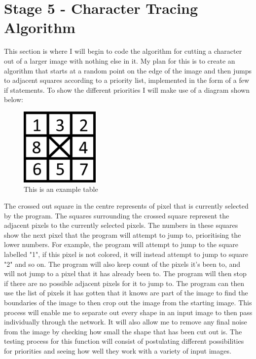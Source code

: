 \documentclass{report}
\begin{document}
\section{Stage 5 - Character Tracing Algorithm}
This section is where I will begin to code the algorithm for cutting a character out of a larger image with nothing else in it. My plan for this is to create an algorithm that starts at a random point on the edge of the image and then jumps to adjacent squares according to a priority list, implemented in the form of a few if statements. To show the different priorities I will make use of a diagram shown below:
\begin{figure}[H]
    \centering
    \includegraphics[height = 1.5in]{Images/Development and Testing/Stage 5/Priority Square Example.png}
    \caption{This is an example table}
    \label{fig:Example Priority Square}
\end{figure}
\noindent The crossed out square in the centre represents of pixel that is currently selected by the program. The squares surrounding the crossed square represent the adjacent pixels to the currently selected pixels. The numbers in these squares show the next pixel that the program will attempt to jump to, prioritising the lower numbers. 
\newline
For example, the program will attempt to jump to the square labelled "1", if this pixel is not colored, it will instead attempt to jump to square "2" and so on. The program will also keep count of the pixels it's been to, and will not jump to a pixel that it has already been to. The program will then stop if there are no possible adjacent pixels for it to jump to.
\newline
The program can then use the list of pixels it has gotten that it knows are part of the image to find the boundaries of the image to then crop out the image from the starting image.
\newline
This process will enable me to separate out every shape in an input image to then pass individually through the network. It will also allow me to remove any final noise from the image by checking how small the shape that has been cut out is. The testing process for this function will consist of postulating different possibilities for priorities and seeing how well they work with a variety of input images.
\end{document}
